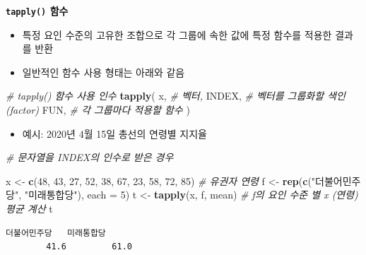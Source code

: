 \documentclass[
  11pt,
]{krantz}
\newenvironment{Shaded}{\begin{snugshade}}{\end{snugshade}}
\newcommand{\CommentTok}[1]{\textcolor[rgb]{0.37,0.37,0.37}{\textit{#1}}}
\newcommand{\DataTypeTok}[1]{\textcolor[rgb]{0.27,0.27,0.27}{#1}}
\newcommand{\DecValTok}[1]{\textcolor[rgb]{0.06,0.06,0.06}{#1}}
\newcommand{\KeywordTok}[1]{\textcolor[rgb]{0.27,0.27,0.27}{\textbf{#1}}}
\newcommand{\NormalTok}[1]{#1}
\newcommand{\StringTok}[1]{\textcolor[rgb]{0.5,0.5,0.5}{#1}}
\providecommand{\tightlist}{%
  \setlength{\itemsep}{0pt}\setlength{\parskip}{0pt}}
\begin{document}
\textbf{\texttt{tapply()} 함수}

\begin{itemize}
\tightlist
\item
  특정 요인 수준의 고유한 조합으로 각 그룹에 속한 값에 특정 함수를 적용한 결과를 반환
\item
  일반적인 함수 사용 형태는 아래와 같음
\end{itemize}

\footnotesize

\begin{Shaded}
\begin{Highlighting}[]
\CommentTok{# tapply() 함수 사용 인수}
\KeywordTok{tapply}\NormalTok{(}
\NormalTok{  x, }\CommentTok{# 벡터, }
\NormalTok{  INDEX, }\CommentTok{# 벡터를 그룹화할 색인(factor)}
\NormalTok{  FUN, }\CommentTok{# 각 그룹마다 적용할 함수}
\NormalTok{)}
\end{Highlighting}
\end{Shaded}

\normalsize

\begin{itemize}
\tightlist
\item
  예시: 2020년 4월 15일 총선의 연령별 지지율
\end{itemize}

\footnotesize

\begin{Shaded}
\begin{Highlighting}[]
\CommentTok{# 문자열을 INDEX의 인수로 받은 경우}

\NormalTok{x <-}\StringTok{ }\KeywordTok{c}\NormalTok{(}\DecValTok{48}\NormalTok{, }\DecValTok{43}\NormalTok{, }\DecValTok{27}\NormalTok{, }\DecValTok{52}\NormalTok{, }\DecValTok{38}\NormalTok{, }
       \DecValTok{67}\NormalTok{, }\DecValTok{23}\NormalTok{, }\DecValTok{58}\NormalTok{, }\DecValTok{72}\NormalTok{, }\DecValTok{85}\NormalTok{) }\CommentTok{# 유권자 연령}
\NormalTok{f <-}\StringTok{ }\KeywordTok{rep}\NormalTok{(}\KeywordTok{c}\NormalTok{(}\StringTok{"더불어민주당"}\NormalTok{, }\StringTok{"미래통합당"}\NormalTok{), }\DataTypeTok{each =} \DecValTok{5}\NormalTok{)}
\NormalTok{t <-}\StringTok{ }\KeywordTok{tapply}\NormalTok{(x, f, mean) }\CommentTok{# f의 요인 수준 별 x (연령) 평균 계산}
\NormalTok{t}
\end{Highlighting}
\end{Shaded}

\begin{verbatim}
더불어민주당   미래통합당 
        41.6         61.0 
\end{verbatim}
\end{document}
